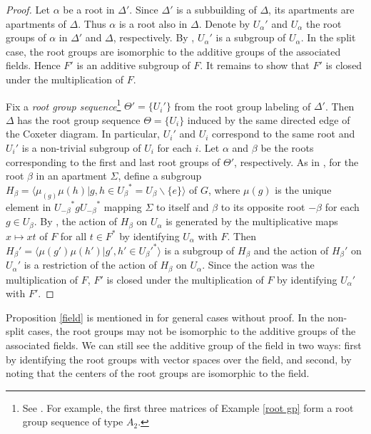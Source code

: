 \documentclass[letterpaper, reqno, 11pt]{amsart}
\theoremstyle{definition}
\theoremstyle{definition}
\theoremstyle{remark}
\newcommand{\al}{\alpha}
\newcommand{\be}{\beta}
\begin{document}
\begin{proof}
    Let $\al$ be a root in $\Delta'$. Since $\Delta'$ is a subbuilding of $\Delta$, its apartments are apartments of $\Delta$. Thus $\al$ is a root also in $\Delta$.
    Denote by $U_{\al}'$ and $U_{\al}$ the root groups 
    of $\al$ in $\Delta'$ and $\Delta$, respectively.
    By \cite[Proposition 7.37]{abramenko2008buildings},
    $U_{\al}'$ is a subgroup of $U_{\al}$. In the split case, the root groups are isomorphic to the additive groups of the associated fields. Hence $F'$ is an additive subgroup of $F$. It remains to show that $F'$ is closed under the multiplication of $F$. 

  
    Fix a \textit{root group sequence}\footnote{See \cite[Definition 12.1]{weiss2004structure}. For example, the first three matrices of Example \ref{root gp} form a root group sequence of type $A_2$.} 
    $\Theta'=\{U_i'\}$ from the root group labeling %
    of $\Delta'$. Then $\Delta$ has the root group sequence $\Theta=\{U_i\}$ induced by the same directed edge of the Coxeter diagram. 
    In particular, $U_i'$ and $U_i$ correspond to the same root and $U_i'$ is a non-trivial subgroup of $U_i$ for each $i$.
    Let $\alpha$ and $\beta$ be the roots corresponding to the first and last root groups of $\Theta'$, respectively.
    As in \cite [Proposition 11.22]{weiss2004structure},
    for the root $\be$ in an apartment $\Sigma$,
    define a subgroup $H_{\be}=\langle \mu_(g)\mu(h) | g,h \in {U_{\be}}^*=U_\be \backslash \{e\} \rangle$ of $G$, where $\mu(g)$ is the unique element in ${U_{-\be}}^*g{U_{-\be}}^*$ mapping $\Sigma$ to itself and $\be$ to its opposite root $-\be$ for each $g \in U_{\be}$.
    By \cite[Lemma 12.22]{weiss2004structure}, the action of $H_\be$ on $U_\al$ is generated by the multiplicative maps $x \mapsto xt$ of $F$ for all $t\in F^*$ by identifying $U_\al$ with $F$. 
    Then $H_\beta'=\langle \mu(g')\mu(h') | g',h' \in U_\beta'^* \rangle$ is a subgroup of $H_\beta$ and the action of $H_\beta'$ on $U_\alpha'$ is a restriction of the action of $H_\beta$ on $U_\alpha$. Since the action was the multiplication of $F$, $F'$ is closed under the multiplication of $F$ by identifying $U_\alpha'$ with $F'$.
\end{proof}



Proposition \ref{field} is mentioned in \cite[p.390]{abramenko2008buildings} for general cases without proof. In the non-split cases, the root groups may not be isomorphic to the additive groups of the associated fields. We can still see the additive group of the field in two ways: first by identifying the root groups with vector spaces over the field, and second, by noting that the centers of the root groups are isomorphic to the field. 
\end{document}
